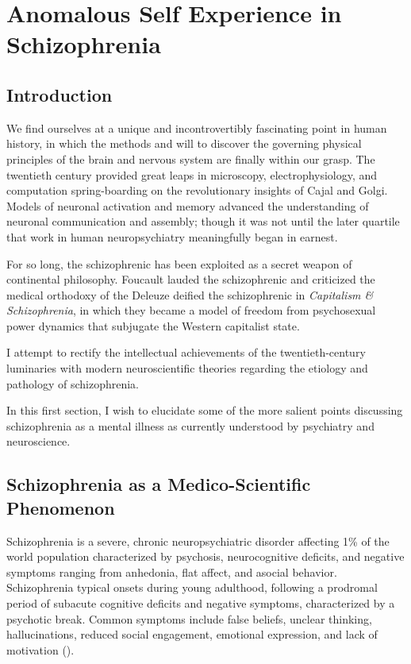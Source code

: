 \documentclass[]{article}
\begin{document}
\section{Anomalous Self Experience in Schizophrenia}

	\subsection{Introduction}
		
		We find ourselves at a unique and incontrovertibly fascinating point in human history, in which the methods and will to discover the governing physical principles of the brain and nervous system are finally within our grasp. The twentieth century provided great leaps in microscopy, electrophysiology, and computation spring-boarding on the revolutionary insights of Cajal and Golgi. Models of neuronal activation and memory advanced the understanding of neuronal communication and assembly; though it was not until the later quartile that work in human neuropsychiatry meaningfully began in earnest. 
		
		For so long, the schizophrenic has been exploited as a secret weapon of continental philosophy. Foucault lauded the schizophrenic and criticized the medical orthodoxy of the  Deleuze deified the schizophrenic in \textit{Capitalism \& Schizophrenia}, in which they became a model of freedom from psychosexual power dynamics that subjugate the Western capitalist state.
		
		I attempt to rectify the intellectual achievements of the twentieth-century luminaries with modern neuroscientific theories regarding the etiology and pathology of schizophrenia.
		
		In this first section, I wish to elucidate some of the more salient points discussing schizophrenia as a mental illness as currently understood by psychiatry and neuroscience. 
	
	
	\subsection{Schizophrenia as a Medico-Scientific Phenomenon}
		
		Schizophrenia is a severe, chronic neuropsychiatric disorder affecting 1\% of the world population characterized by psychosis, neurocognitive deficits, and negative symptoms ranging from anhedonia, flat affect, and asocial behavior. Schizophrenia typical onsets during young adulthood, following a prodromal period of subacute cognitive deficits and negative symptoms, characterized by a psychotic break. Common symptoms include false beliefs, unclear thinking, hallucinations, reduced social engagement, emotional expression, and lack of motivation (\cite{TandonSchizophreniajustfacts2009,HinchliffSynthesisphylogenytaxonomy2015}).
		
\end{document}
